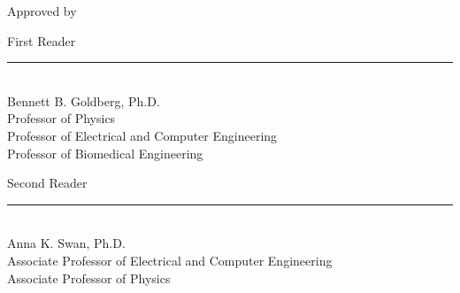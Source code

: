 \begin{titlepage}	%

\begin{center}
Approved by
\end{center}

\vspace{1.5in}

\begin{singlespace}
	\noindent
	First Reader\ \ \ \ \  \ \rule{4.7in}{.005in}\\
	\hspace*{1.15in}Bennett B. Goldberg, Ph.D.\\
	\hspace*{1.15in}Professor of Physics \\
	\hspace*{1.15in}Professor of Electrical and Computer Engineering \\
	\hspace*{1.15in}Professor of Biomedical Engineering\\

	\vspace{0.75in}

	\noindent
	Second Reader\ \ \ \rule{4.7in}{.005in}\\
	\hspace*{1.15in}Anna K. Swan, Ph.D.\\
	\hspace*{1.15in}Associate Professor of Electrical and Computer Engineering\\
	\hspace*{1.15in}Associate Professor of Physics\\
\end{singlespace}

\end{titlepage}